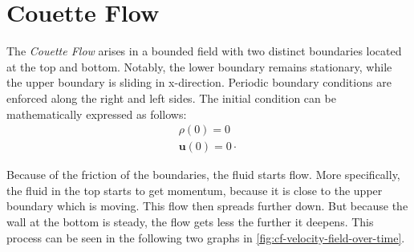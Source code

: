 \section{Couette Flow}\label{sec:couette-flow}
The \textit{Couette Flow} arises in a bounded field with two distinct boundaries located at the top and bottom.
Notably, the lower boundary remains stationary, while the upper boundary is sliding in x-direction.
Periodic boundary conditions are enforced along the right and left sides.
The initial condition can be mathematically expressed as follows:
\begin{equation*}
    \begin{gathered}
        \rho(0) = 0 \\
        \mathbf{u}(0) = 0 \cdot
    \end{gathered}
\end{equation*}

Because of the friction of the boundaries, the fluid starts flow.
More specifically, the fluid in the top starts to get momentum, because it is close to the upper boundary which is moving.
This flow then spreads further down.
But because the wall at the bottom is steady, the flow gets less the further it deepens.
This process can be seen in the following two graphs in \cref{fig:cf-velocity-field-over-time}.


